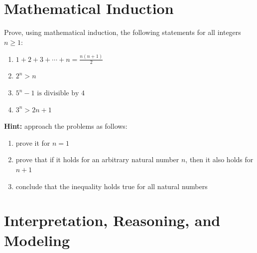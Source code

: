 \documentclass{article}
\begin{document}
\section{Mathematical Induction}

Prove, using mathematical induction, the following statements for all integers \( n \geq 1 \):

\begin{enumerate}[leftmargin = 0.5cm, label = (\alph*), rightmargin = 0.2cm]

    \item $1 + 2 + 3 + \cdots + n = \frac{n(n+1)}{2}$

    \item $2^n > n$

    \item $5^n - 1 \text{ is divisible by } 4$

    \item $3^n > 2n + 1$

\end{enumerate}

\textbf{Hint:} approach the problems as follows:
\begin{enumerate}[leftmargin = 0.5cm, label = \arabic*., rightmargin = 0.2cm]
    \item prove it for $n = 1$
    \item prove that if it holds for an arbitrary natural number $n$, then it also holds for $n+1$
    \item conclude that the inequality holds true for all natural numbers
\end{enumerate}

\section{Interpretation, Reasoning, and Modeling}
\end{document}
